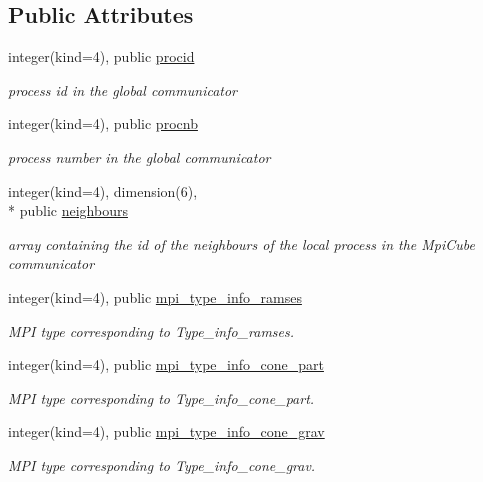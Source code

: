 \subsection*{Public Attributes}
\begin{DoxyCompactItemize}
\item 
integer(kind=4), public \hyperlink{classmodmpicommons_a895d05e6095a8a0c14013d3af546148f}{procid}
\begin{DoxyCompactList}\small\item\em process id in the global communicator \end{DoxyCompactList}\item 
integer(kind=4), public \hyperlink{classmodmpicommons_ae6d2f748e667900423c3bd8404bf165d}{procnb}
\begin{DoxyCompactList}\small\item\em process number in the global communicator \end{DoxyCompactList}\item 
integer(kind=4), dimension(6), \\*
public \hyperlink{classmodmpicommons_aeb9144358efbf3350b75103e7c5e356f}{neighbours}
\begin{DoxyCompactList}\small\item\em array containing the id of the neighbours of the local process in the Mpi\-Cube communicator \end{DoxyCompactList}\item 
integer(kind=4), public \hyperlink{classmodmpicommons_ad9669ed4065b2389ec88512a5fa63c3c}{mpi\-\_\-type\-\_\-info\-\_\-ramses}
\begin{DoxyCompactList}\small\item\em M\-P\-I type corresponding to Type\-\_\-info\-\_\-ramses. \end{DoxyCompactList}\item 
integer(kind=4), public \hyperlink{classmodmpicommons_a9ab9e509165ff81f220a2a2a9e5057d9}{mpi\-\_\-type\-\_\-info\-\_\-cone\-\_\-part}
\begin{DoxyCompactList}\small\item\em M\-P\-I type corresponding to Type\-\_\-info\-\_\-cone\-\_\-part. \end{DoxyCompactList}\item 
integer(kind=4), public \hyperlink{classmodmpicommons_a3cc383a12a1eab12b23c3ab54ff01fbc}{mpi\-\_\-type\-\_\-info\-\_\-cone\-\_\-grav}
\begin{DoxyCompactList}\small\item\em M\-P\-I type corresponding to Type\-\_\-info\-\_\-cone\-\_\-grav. \end{DoxyCompactList}\item 

\end{DoxyCompactItemize}
